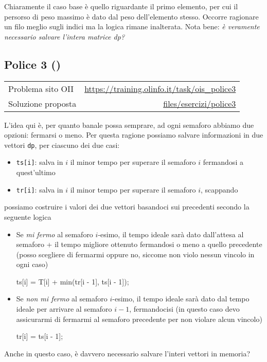 Chiaramente il caso base è quello riguardante il primo elemento, per cui il persorso di peso massimo è dato dal peso dell'elemento stesso.
\vskip3mm
Occorre ragionare un filo meglio sugli indici ma la logica rimane inalterata. Nota bene: \textit{è veramente necessario salvare l'intera matrice dp?}


\subsection{Police 3 {()}}
\label{sol police3}
\begin{center}
	\begin{tabularx}{\textwidth}{X r}
		\toprule
		Problema sito OII  & \url{https://training.olinfo.it/task/ois_police3}                     \\
		Soluzione proposta & \ttfamily\href{run:./files/esercizi/discesa/}{files/esercizi/police3} \\
		\bottomrule
	\end{tabularx}
\end{center}
L'idea qui è, per quanto banale possa semprare, ad ogni semaforo abbiamo due opzioni: fermarsi o meno. Per questa ragione possiamo salvare informazioni in due vettori \verb|dp|, per ciascuno dei due casi:
\begin{itemize}
	\item \verb|ts[i]|: salva in $ i $ il minor tempo per superare il semaforo $ i $ fermandosi a quest'ultimo
	\item \verb|tr[i]|: salva in $ i $ il minor tempo per superare il semaforo $ i $, scappando
\end{itemize}
possiamo costruire i valori dei due vettori basandoci sui precedenti secondo la seguente logica
\begin{itemize}
	\item Se \textit{mi fermo} al semaforo $ i $-esimo, il tempo ideale sarà dato dall'attesa al semaforo + il tempo migliore ottenuto fermandosi o meno a quello precedente (posso scegliere di fermarmi oppure no, siccome non violo nessun vincolo in ogni caso)
	      \begin{center}
		      \ttfamily
		      ts[i] = T[i] + min(tr[i - 1], ts[i - 1]);
	      \end{center}
	\item Se \textit{non mi fermo} al semaforo $ i $-esimo, il tempo ideale sarà dato dal tempo ideale per arrivare al semaforo $ i-1 $, fermandocisi (in questo caso devo assicurarmi di fermarmi al semaforo precedente per non violare alcun vincolo)
	      \begin{center}
		      \ttfamily
		      tr[i] = ts[i - 1];
	      \end{center}
\end{itemize}
Anche in questo caso, è davvero necessario salvare l'interi vettori in memoria?

